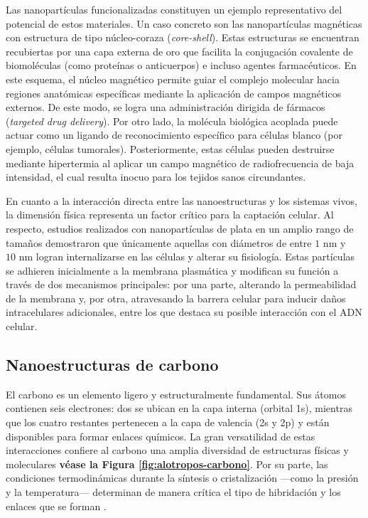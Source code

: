Las nanopartículas funcionalizadas constituyen un ejemplo representativo del potencial de estos materiales. Un caso concreto son las nanopartículas magnéticas con estructura de tipo núcleo-coraza (\textit{core-shell}). Estas estructuras se encuentran recubiertas por una capa externa de oro que facilita la conjugación covalente de biomoléculas (como proteínas o anticuerpos) e incluso agentes farmacéuticos. En este esquema, el núcleo magnético permite guiar el complejo molecular hacia regiones anatómicas específicas mediante la aplicación de campos magnéticos externos. De este modo, se logra una administración dirigida de fármacos (\textit{targeted drug delivery}). Por otro lado, la molécula biológica acoplada puede actuar como un ligando de reconocimiento específico para células blanco (por ejemplo, células tumorales). Posteriormente, estas células pueden destruirse mediante hipertermia al aplicar un campo magnético de radiofrecuencia de baja intensidad, el cual resulta inocuo para los tejidos sanos circundantes. 

En cuanto a la interacción directa entre las nanoestructuras y los sistemas vivos, la dimensión física representa un factor crítico para la captación celular. Al respecto, estudios realizados con nanopartículas de plata en un amplio rango de tamaños demostraron que únicamente aquellas con diámetros de entre $1\text{ nm}$ y $10\text{ nm}$ logran internalizarse en las células y alterar su fisiología. Estas partículas se adhieren inicialmente a la membrana plasmática y modifican su función a través de dos mecanismos principales: por una parte, alterando la permeabilidad de la membrana y, por otra, atravesando la barrera celular para inducir daños intracelulares adicionales, entre los que destaca su posible interacción con el ADN celular. 
\subsection{Nanoestructuras de carbono}
El carbono es un elemento ligero y estructuralmente fundamental. Sus átomos contienen seis electrones: dos se ubican en la capa interna (orbital 1s), mientras que los cuatro restantes pertenecen a la capa de valencia (2s y 2p) y están disponibles para formar enlaces químicos. La gran versatilidad de estas interacciones confiere al carbono una amplia diversidad de estructuras físicas y moleculares \textbf{véase la Figura \ref{fig:alotropos-carbono}}. Por su parte, las condiciones termodinámicas durante la síntesis o cristalización —como la presión y la temperatura— determinan de manera crítica el tipo de hibridación y los enlaces que se forman \cite{martinez2024emergence}.

